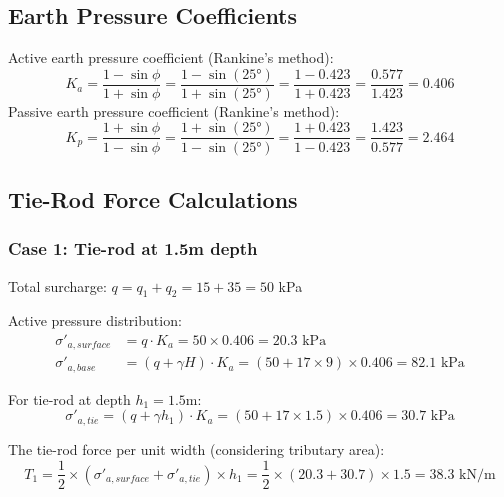 \documentclass[10pt,a4paper,twocolumn]{article}
\begin{document}

\subsection{Earth Pressure Coefficients}

Active earth pressure coefficient (Rankine's method):
\begin{equation}
K_a = \frac{1 - \sin\phi}{1 + \sin\phi} = \frac{1 - \sin(25°)}{1 + \sin(25°)} = \frac{1 - 0.423}{1 + 0.423} = \frac{0.577}{1.423} = 0.406
\end{equation}
 Passive earth pressure coefficient (Rankine's method):
\begin{equation}
K_p = \frac{1 + \sin\phi}{1 - \sin\phi} = \frac{1 + \sin(25°)}{1 - \sin(25°)} = \frac{1 + 0.423}{1 - 0.423} = \frac{1.423}{0.577} = 2.464
\end{equation}


\subsection{Tie-Rod Force Calculations}

\subsubsection{Case 1: Tie-rod at 1.5m depth}

Total surcharge: $q = q_1 + q_2 = 15 + 35 = 50$ kPa

Active pressure distribution:
\begin{align}
\sigma'_{a,surface} &= q \cdot K_a = 50 \times 0.406 = 20.3 \text{ kPa}\\
\sigma'_{a,base} &= (q + \gamma H) \cdot K_a = (50 + 17 \times 9) \times 0.406 = 82.1 \text{ kPa}
\end{align}

For tie-rod at depth $h_1 = 1.5$m:
\begin{equation}
\sigma'_{a,tie} = (q + \gamma h_1) \cdot K_a = (50 + 17 \times 1.5) \times 0.406 = 30.7 \text{ kPa}
\end{equation}

The tie-rod force per unit width (considering tributary area):
\begin{equation}
T_1 = \frac{1}{2} \times (\sigma'_{a,surface} + \sigma'_{a,tie}) \times h_1 = \frac{1}{2} \times (20.3 + 30.7) \times 1.5 = 38.3 \text{ kN/m}
\end{equation}
\end{document}
